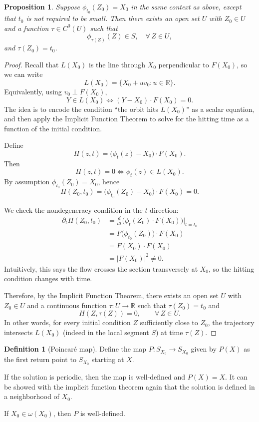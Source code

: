 \documentclass{tufte-handout}
\newcommand*\R{\mathbb{R}}
\newtheorem{prop}[thm]{Proposition}
\theoremstyle{definition}
\newtheorem{defn}[thm]{Definition}
\begin{document}
\begin{prop}
	Suppose $\phi_{t_0}(Z_0)=X_0$ in the same context as above, except that
	$t_0$ is not required to be small.
	Then there exists an open set $U$ with $Z_0\in U$ and a function
	$\tau \in C^0(U)$ such that
	\[
		\phi_{\tau(Z)}(Z)\in S,
		\quad \forall\, Z\in U,
	\]
	and $\tau(Z_0)=t_0$.
\end{prop}

\begin{proof}
	Recall that $L(X_0)$ is the line through $X_0$ perpendicular to $F(X_0)$, so we can write
	\[
		L(X_0)=\{X_0+u v_0 : u\in \R\}.
	\]
	Equivalently, using $v_0 \perp F(X_0)$,
	\[
		Y \in L(X_0)
		\iff (Y-X_0)\cdot F(X_0)=0.
	\]
	The idea is to encode the condition “the orbit hits $L(X_0)$” as a scalar equation,
	and then apply the Implicit Function Theorem to solve for the hitting time as a function of
	the initial condition.

	Define
	\[
		H(z,t)=\big(\phi_t(z)-X_0\big)\cdot F(X_0).
	\]
	Then
	\[
		H(z,t)=0 \iff \phi_t(z)\in L(X_0).
	\]
	By assumption $\phi_{t_0}(Z_0)=X_0$, hence
	\[
		H(Z_0,t_0)=\big(\phi_{t_0}(Z_0)-X_0\big)\cdot F(X_0)=0.
	\]

	We check the nondegeneracy condition in the $t$-direction:
	\begin{align*}
		\partial_t H(Z_0,t_0)
		&= \frac{d}{dt}\Big(\phi_t(Z_0)\cdot F(X_0)\Big)\Big|_{t=t_0} \\
		&= F\big(\phi_{t_0}(Z_0)\big)\cdot F(X_0) \\
		&= F(X_0)\cdot F(X_0) \\
		&= |F(X_0)|^2 \ne 0.
	\end{align*}
	Intuitively, this says the flow crosses the section transversely at $X_0$,
	so the hitting condition changes with time.

	Therefore, by the Implicit Function Theorem, there exists an open set $U$ with $Z_0\in U$
	and a continuous function $\tau:U\to \R$ such that $\tau(Z_0)=t_0$ and
	\[
		H(Z,\tau(Z))=0,\qquad \forall\, Z\in U.
	\]
	In other words, for every initial condition $Z$ sufficiently close to $Z_0$,
	the trajectory intersects $L(X_0)$ (indeed in the local segment $S$) at time $\tau(Z)$.
\end{proof}

\begin{defn}[Poincar\'e map]
	Define the map $P: S_{X_0} \to S_{X_0}$  given by $P(X)$ as the first return point to $S_{X_0}$ starting at $X$.

	If the solution is periodic, then the map is well-defined and $P(X) = X$. It can be showed with the implicit function theorem again that the solution is defined in a neighborhood of $X_0$.

	If $X_0 \in \omega(X_0)$, then $P$ is well-defined.
\end{defn}
\end{document}
